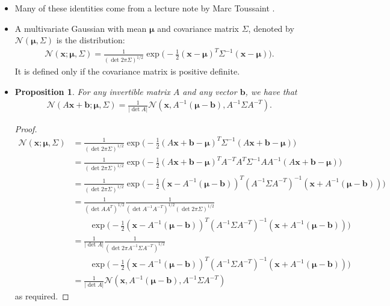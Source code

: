 \documentclass[10pt]{article}
\newtheorem{proposition}[lemma]{Proposition}
\newcommand{\ve}[1]{\mathbf{#1}}
\newcommand{\ves}[1]{\boldsymbol{#1}}
\newcommand{\N}{\mathcal{N}}
\begin{document}
\begin{itemize}
  \item Many of these identities come from a lecture note by Marc Toussaint \cite{Toussaint:2011}.
  
  \item A multivariate Gaussian with mean $\ves{\mu}$ and covariance matrix $\Sigma$, denoted by $\N(\ves{\mu},\Sigma)$ is the distribution:
  \begin{align*}
  \N(\ve{x}; \ves{\mu}, \Sigma) = \frac{1}{(\det 2\pi\Sigma)^{1/2}} \exp\bigg(-\frac{1}{2} (\ve{x}-\ves{\mu})^T \Sigma^{-1} (\ve{x}-\ves{\mu}) \bigg).
  \end{align*}
  It is defined only if the covariance matrix is positive definite.  
  
  \item \begin{proposition}
    For any invertible matrix $A$ and any vector $\ve{b}$, we have that
    \begin{align*}
    \N(A\ve{x} + \ve{b}; \ves{\mu}, \Sigma) = \frac{1}{|\det A|} \N(\ve{x}, A^{-1}(\ves{\mu} - \ve{b}), A^{-1}\Sigma A^{-T}).
    \end{align*}
  \end{proposition}

  \begin{proof}
    \begin{align*}
    \N(\ve{x}; \ves{\mu}, \Sigma) 
    &= \frac{1}{(\det 2\pi\Sigma)^{1/2}} \exp\bigg(-\frac{1}{2} (A\ve{x} + \ve{b} -\ves{\mu})^T \Sigma^{-1} (A\ve{x} + \ve{b} -\ves{\mu}) \bigg) \\
    &= \frac{1}{(\det 2\pi\Sigma)^{1/2}} \exp\bigg(-\frac{1}{2} (A\ve{x} + \ve{b} -\ves{\mu})^T A^{-T} A^T \Sigma^{-1} A A^{-1} (A\ve{x} + \ve{b} -\ves{\mu}) \bigg) \\
    &= \frac{1}{(\det 2\pi\Sigma)^{1/2}} \exp\bigg(-\frac{1}{2} (\ve{x} - A^{-1}(\ves{\mu} - \ve{b}))^T (A^{-1} \Sigma A^{-T})^{-1} (\ve{x} + A^{-1}(\ves{\mu} - \ve{b})) \bigg) \\
    &= \frac{1}{(\det AA^T)^{1/2}} \frac{1}{ (\det A^{-1}A^{-T})^{1/2} (\det 2\pi\Sigma)^{1/2}} \\
    & \qquad \exp\bigg(-\frac{1}{2} (\ve{x} - A^{-1}(\ves{\mu} - \ve{b}))^T (A^{-1} \Sigma A^{-T})^{-1} (\ve{x} + A^{-1}(\ves{\mu} - \ve{b})) \bigg) \\
    &= \frac{1}{|\det A|} \frac{1}{ (\det 2\pi A^{-1}\Sigma A^{-T})^{1/2}} \\
    & \qquad \exp\bigg(-\frac{1}{2} (\ve{x} - A^{-1}(\ves{\mu} - \ve{b}))^T (A^{-1} \Sigma A^{-T})^{-1} (\ve{x} + A^{-1}(\ves{\mu} - \ve{b})) \bigg) \\
    &= \frac{1}{|\det A|} \N(\ve{x}, A^{-1}(\ves{\mu} - \ve{b}), A^{-1}\Sigma A^{-T})
    \end{align*}
    as required.
  \end{proof}  


\end{itemize}
\end{document}
